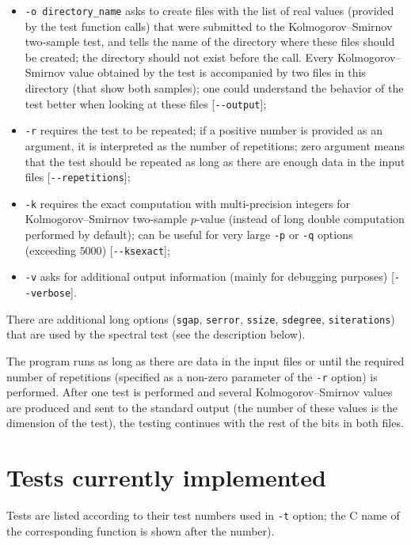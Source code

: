 \documentclass[12pt,a4paper,fullpage]{article}
\begin{document}
\begin{itemize}
\item \texttt{-o directory\_name} asks to create files with the list of real values (provided by the test function calls) that were submitted to the Kolmogorov--Smirnov two-sample test, and tells the name of the directory where these files should be created; the directory should not exist before the call. Every Kolmogorov--Smirnov value obtained by the test is accompanied by two files in this directory (that show both samples); one could understand the behavior of the test better when looking at these files [\texttt{{-}-output}];

\item \texttt{-r} requires the test to be repeated; if a positive number is provided as an argument, it is interpreted as the number of repetitions; zero argument means that the test should be repeated as long as there are enough data in the input files [\texttt{{-}-repetitions}];

\item \texttt{-k} requires the exact computation with multi-precision integers for Kol\-mo\-go\-rov--Smir\-nov two-sample $p$-value (instead of long double computation performed by default); can be useful for very large \texttt{-p} or \texttt{-q} options (exceeding $5000$) [\texttt{{-}-ksexact}];

\item \texttt{-v} asks for additional output information (mainly for debugging purposes) [\texttt{{-}-verbose}].
\end{itemize}

There are additional long options (\texttt{sgap}, \texttt{serror}, \texttt{ssize}, \texttt{sdegree}, \texttt{siterations}) that are used by the spectral test (see the description below).

The program runs as long as there are data in the input files or until the required number of repetitions (specified as a non-zero parameter of the \texttt{-r} option) is performed. After one test is performed and several Kolmogorov--Smirnov values are produced and sent to the standard output (the number of these values is the dimension of the test), the testing continues with the rest of the bits in both files.

\section{Tests currently implemented}

Tests are listed according to their test numbers used in \texttt{-t} option; the C name of the corresponding function is shown after the number).
\end{document}
